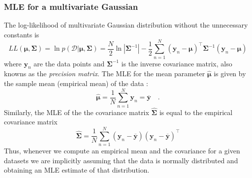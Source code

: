 \documentclass[12pt,dvipsnames]{report}
\renewcommand{\vec}[1]{\boldsymbol{\mathbf{#1}}}
\begin{document}
\subsubsection{MLE for a multivariate Gaussian}
The log-likelihood of multivariate Gaussian distribution without the
unnecessary constants is
\begin{equation}
    L L(\boldsymbol{\mu}, \boldsymbol{\Sigma})=\ln p(\mathcal{D} \lvert \boldsymbol{\mu}, \boldsymbol{\Sigma})=\frac{N}{2} \ln |\vec{\Sigma}^{-1}|-\frac{1}{2} \sum_{n=1}^{N}\left(\boldsymbol{y}_{n}-\boldsymbol{\mu}\right)^{\intercal} \vec{\Sigma}^{-1}\left(\boldsymbol{y}_{n}-\boldsymbol{\mu}\right)
\end{equation}
where $\vec{y}_n$ are the data points and $\vec{\Sigma}^{-1}$ is
the inverse covariance matrix, also knowns as the \emph{precision matrix}.
The MLE for the mean parameter $\hat{\vec{\mu}}$
is given by the sample mean (empirical mean) of the data \citep{murphy_book_2022}:
\begin{equation}
    \hat{\boldsymbol{\mu}}=\frac{1}{N} \sum_{n=1}^{N} \boldsymbol{y}_{n}=\overline{\boldsymbol{y}}\quad .
\end{equation}
Similarly, the MLE of the the covariance matrix $\hat{\vec{\Sigma}}$ is equal to
the empirical covariance matrix
\begin{equation}
    \hat{\boldsymbol{\Sigma}}=\frac{1}{N} \sum_{n=1}^{N}\left(\boldsymbol{y}_{n}-\overline{\boldsymbol{y}}\right)\left(\boldsymbol{y}_{n}-\overline{\boldsymbol{y}}\right)^{\intercal}
\end{equation}
Thus, whenever we compute an empirical mean and the covariance for a given datasets we
are implicitly assuming that the data is normally distributed and obtaining an MLE
estimate of that distribution.
\end{document}
